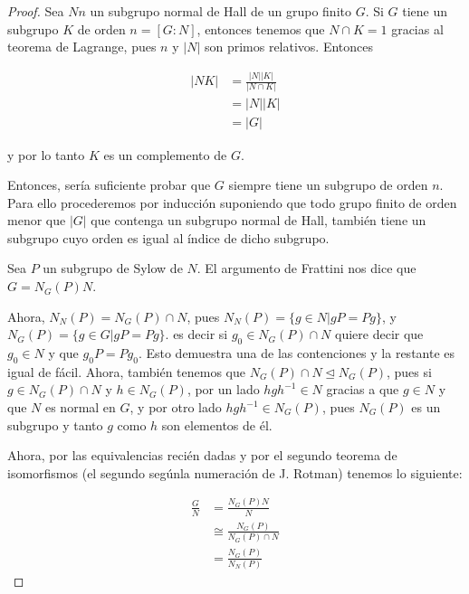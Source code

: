 \begin{proof}
    Sea $Nn$ un subgrupo normal de Hall de un grupo finito $G$. Si $G$ tiene un subgrupo $K$ de orden $n = [G:N]$, entonces
    tenemos que $N \cap K = 1$ gracias al teorema de Lagrange, pues $n$ y $|N|$ son primos relativos. Entonces
    
    \begin{align}
        |NK|    &= \frac{|N||K|}{|N \cap K|}    \\
                &= |N||K|                       \\
                &= |G| 
    \end{align}
    
    y por lo tanto $K$ es un complemento de $G$.\par\null
    
    Entonces, sería suficiente probar que $G$ siempre tiene un subgrupo de orden $n$. Para ello procederemos por inducción
    suponiendo que todo grupo finito de orden menor que $|G|$ que contenga un subgrupo normal de Hall, también
    tiene un subgrupo cuyo orden es igual al índice de dicho subgrupo.\par\null
    
    Sea $P$ un subgrupo de Sylow de $N$. El argumento de Frattini nos dice que $G = N_G(P)N$.\par\null
    
    Ahora, $N_N(P) = N_G(P) \cap N$, pues $N_N(P) = \{ g\in N | gP = Pg \}$, y $N_G(P) = \{ g\in G | gP = Pg \}$. es decir
    si $g_0 \in N_G(P) \cap N$ quiere decir que $g_0 \in N$ y que $g_0P = Pg_0$. Esto demuestra una de las contenciones y la
    restante es igual de fácil. Ahora,  también tenemos que $N_G(P) \cap N \trianglelefteq N_G(P)$, pues si $g \in N_G(P) \cap N$ y
    $h \in N_G(P)$, por un lado $hgh^{-1} \in N$ gracias a que $g \in N$ y que $N$ es normal en $G$, y por otro lado 
    $hgh^{-1} \in N_G(P)$, pues $N_G(P)$ es un subgrupo y tanto $g$ como $h$ son elementos de él.\par\null
    
    Ahora, por las equivalencias recién dadas y por el segundo teorema de isomorfismos 
    (el segundo segúnla numeración de J. Rotman) tenemos lo siguiente:
    
    \begin{align}
            \frac{G}{N}     &=      \frac{N_G(P)N}{N}               \\
                            &\cong  \frac{N_G(P)}{N_G(P) \cap N}    \\
                            &=      \frac{N_G(P)}{N_N(P)}
    \end{align}
\end{proof}